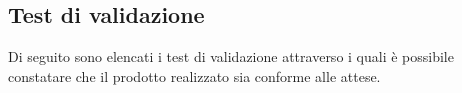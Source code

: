 \subsection{Test di validazione}

Di seguito sono elencati i test di validazione attraverso i quali è possibile constatare che il prodotto realizzato sia conforme alle attese.

%
%	
